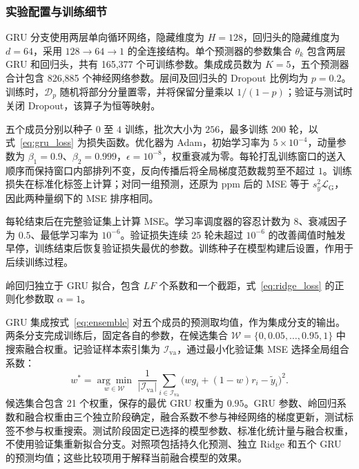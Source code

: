 \subsubsection{实验配置与训练细节}
\label{sec:exp:training}
GRU 分支使用两层单向循环网络，隐藏维度为 $H=128$，回归头的隐藏维度为 $d=64$，采用 $128\rightarrow64\rightarrow1$ 的全连接结构。单个预测器的参数集合 $\theta_k$ 包含两层 GRU 和回归头，共有 165,377 个可训练参数。集成成员数为 $K=5$，五个预测器合计包含 826,885 个神经网络参数。层间及回归头的 Dropout 比例均为 $p=0.2$。训练时，$\mathcal{D}_p$ 随机将部分分量置零，并将保留分量乘以 $1/(1-p)$；验证与测试时关闭 Dropout，该算子为恒等映射。

五个成员分别以种子 $0$ 至 $4$ 训练，批次大小为 $256$，最多训练 $200$ 轮，以式~\eqref{eq:gru_loss} 为损失函数。优化器为 Adam\citep{kingma2015adam}，初始学习率为 $5\times10^{-4}$，动量参数为 $\beta_1=0.9$、$\beta_2=0.999$，$\epsilon=10^{-8}$，权重衰减为零。每轮打乱训练窗口的送入顺序而保持窗口内部排列不变，反向传播后将全局梯度范数裁剪至不超过 $1$。训练损失在标准化标签上计算；对同一组预测，还原为 ppm 后的 MSE 等于 $s_y^2\mathcal{L}_{\mathrm{G}}$，因此两种量纲下的 MSE 排序相同。

每轮结束后在完整验证集上计算 MSE。学习率调度器的容忍计数为 $8$、衰减因子为 $0.5$、最低学习率为 $10^{-6}$。验证损失连续 $25$ 轮未超过 $10^{-6}$ 的改善阈值时触发早停，训练结束后恢复验证损失最优的参数。训练种子在模型构建后设置，作用于后续训练过程。

岭回归独立于 GRU 拟合，包含 $LF$ 个系数和一个截距，式~\eqref{eq:ridge_loss} 的正则化参数取 $\alpha=1$。

GRU 集成按式~\eqref{eq:ensemble} 对五个成员的预测取均值，作为集成分支的输出。两条分支完成训练后，固定各自的参数，在候选集合 $\mathcal{W}=\{0,0.05,\ldots,0.95,1\}$ 中搜索融合权重。记验证样本索引集为 $\mathcal{I}_{\mathrm{va}}$，通过最小化验证集 MSE 选择全局组合系数：
\begin{equation}
    w^*=\underset{w\in\mathcal{W}}{\arg\min}\;
    \frac{1}{|\mathcal{I}_{\mathrm{va}}|}
    \sum_{i\in\mathcal{I}_{\mathrm{va}}}
    \bigl(w g_i+(1-w)r_i-\widetilde{y}_i\bigr)^2.
    \label{eq:fusion_selection}
\end{equation}
候选集合包含 21 个权重，保存的最优 GRU 权重为 $0.95$。GRU 参数、岭回归系数和融合权重由三个独立阶段确定，融合系数不参与神经网络的梯度更新，测试标签不参与权重搜索。测试阶段固定已选择的模型参数、标准化统计量与融合权重，不使用验证集重新拟合分支。对照项包括持久化预测、独立 Ridge 和五个 GRU 的预测均值；这些比较项用于解释当前融合模型的效果。

